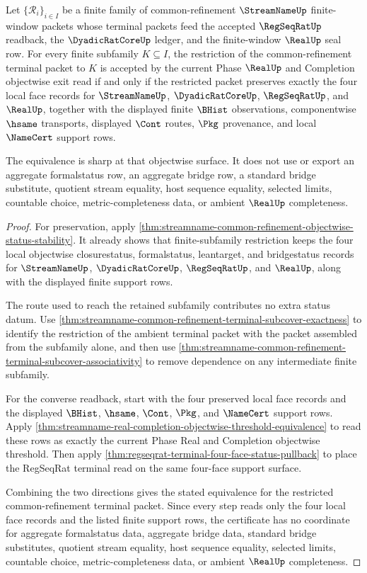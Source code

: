 \begin{theorem}
\label{thm:streamname-common-refinement-objectwise-status-sharpness}
Let $\{\mathcal R_i\}_{i \in I}$ be a finite family of common-refinement $\StreamNameUp$ finite-window packets whose terminal packets feed the accepted $\RegSeqRatUp$ readback, the $\DyadicRatCoreUp$ ledger, and the finite-window $\RealUp$ seal row. For every finite subfamily $K \subseteq I$, the restriction of the common-refinement terminal packet to $K$ is accepted by the current Phase $\RealUp$ and Completion objectwise exit read if and only if the restricted packet preserves exactly the four local face records for $\StreamNameUp$, $\DyadicRatCoreUp$, $\RegSeqRatUp$, and $\RealUp$, together with the displayed finite $\BHist$ observations, componentwise $\hsame$ transports, displayed $\Cont$ routes, $\Pkg$ provenance, and local $\NameCert$ support rows.

The equivalence is sharp at that objectwise surface. It does not use or export an aggregate formalstatus row, an aggregate bridge row, a standard bridge substitute, quotient stream equality, host sequence equality, selected limits, countable choice, metric-completeness data, or ambient $\RealUp$ completeness.
\end{theorem}
\begin{proof}
For preservation, apply \autoref{thm:streamname-common-refinement-objectwise-status-stability}. It already shows that finite-subfamily restriction keeps the four local objectwise closurestatus, formalstatus, leantarget, and bridgestatus records for $\StreamNameUp$, $\DyadicRatCoreUp$, $\RegSeqRatUp$, and $\RealUp$, along with the displayed finite support rows.

The route used to reach the retained subfamily contributes no extra status datum. Use \autoref{thm:streamname-common-refinement-terminal-subcover-exactness} to identify the restriction of the ambient terminal packet with the packet assembled from the subfamily alone, and then use \autoref{thm:streamname-common-refinement-terminal-subcover-associativity} to remove dependence on any intermediate finite subfamily.

For the converse readback, start with the four preserved local face records and the displayed $\BHist$, $\hsame$, $\Cont$, $\Pkg$, and $\NameCert$ support rows. Apply \autoref{thm:streamname-real-completion-objectwise-threshold-equivalence} to read these rows as exactly the current Phase Real and Completion objectwise threshold. Then apply \autoref{thm:regseqrat-terminal-four-face-status-pullback} to place the RegSeqRat terminal read on the same four-face support surface.

Combining the two directions gives the stated equivalence for the restricted common-refinement terminal packet. Since every step reads only the four local face records and the listed finite support rows, the certificate has no coordinate for aggregate formalstatus data, aggregate bridge data, standard bridge substitutes, quotient stream equality, host sequence equality, selected limits, countable choice, metric-completeness data, or ambient $\RealUp$ completeness.
\end{proof}

